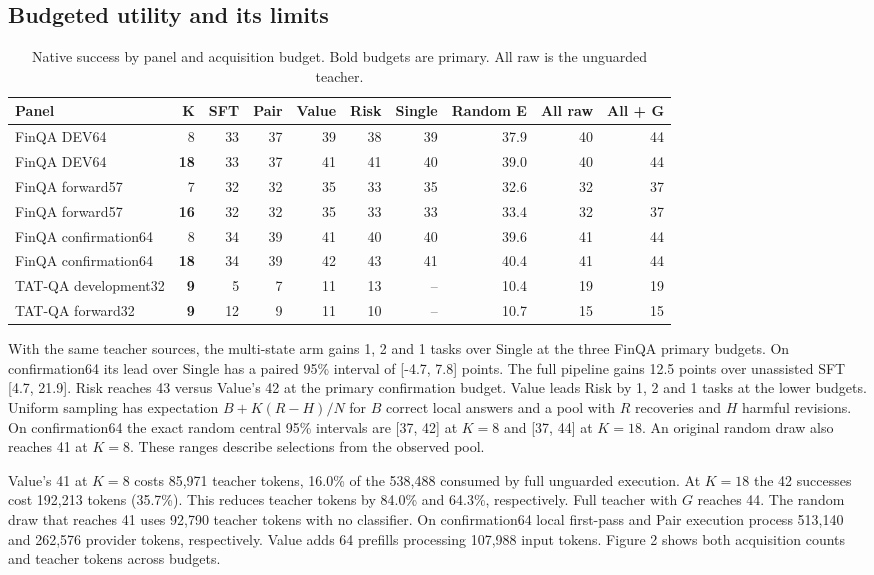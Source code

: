 \documentclass[10pt,letterpaper,conference]{IEEEtran}
\begin{document}
\subsection{Budgeted utility and its limits}\label{budgeted-utility-and-its-limits}

\begin{table}[!t]
\centering
\caption{Native success by panel and acquisition budget. Bold budgets are primary. All raw is the unguarded teacher.}
\label{tab:2}
\begin{tabular}{@{}lrrrrrrrrr@{}}
\toprule
Panel & K & SFT & Pair & Value & Risk & Single & Random E & All raw & All + G \\
\midrule
FinQA DEV64 & 8 & 33 & 37 & 39 & 38 & 39 & 37.9 & 40 & 44 \\
FinQA DEV64 & \textbf{18} & 33 & 37 & 41 & 41 & 40 & 39.0 & 40 & 44 \\
FinQA forward57 & 7 & 32 & 32 & 35 & 33 & 35 & 32.6 & 32 & 37 \\
FinQA forward57 & \textbf{16} & 32 & 32 & 35 & 33 & 33 & 33.4 & 32 & 37 \\
FinQA confirmation64 & 8 & 34 & 39 & 41 & 40 & 40 & 39.6 & 41 & 44 \\
FinQA confirmation64 & \textbf{18} & 34 & 39 & 42 & 43 & 41 & 40.4 & 41 & 44 \\
TAT-QA development32 & \textbf{9} & 5 & 7 & 11 & 13 & -- & 10.4 & 19 & 19 \\
TAT-QA forward32 & \textbf{9} & 12 & 9 & 11 & 10 & -- & 10.7 & 15 & 15 \\
\bottomrule
\end{tabular}
\end{table}

With the same teacher sources, the multi-state arm gains 1, 2 and 1 tasks over Single at the three FinQA primary budgets. On confirmation64 its lead over Single has a paired 95\% interval of {[}-4.7, 7.8{]} points. The full pipeline gains 12.5 points over unassisted SFT {[}4.7, 21.9{]}. Risk reaches 43 versus Value's 42 at the primary confirmation budget. Value leads Risk by 1, 2 and 1 tasks at the lower budgets. Uniform sampling has expectation \(B+K(R-H)/N\) for \(B\) correct local answers and a pool with \(R\) recoveries and \(H\) harmful revisions. On confirmation64 the exact random central 95\% intervals are {[}37, 42{]} at \(K=8\) and {[}37, 44{]} at \(K=18\). An original random draw also reaches 41 at \(K=8\). These ranges describe selections from the observed pool.

Value's 41 at \(K=8\) costs 85,971 teacher tokens, 16.0\% of the 538,488 consumed by full unguarded execution. At \(K=18\) the 42 successes cost 192,213 tokens (35.7\%). This reduces teacher tokens by 84.0\% and 64.3\%, respectively. Full teacher with \(G\) reaches 44. The random draw that reaches 41 uses 92,790 teacher tokens with no classifier. On confirmation64 local first-pass and Pair execution process 513,140 and 262,576 provider tokens, respectively. Value adds 64 prefills processing 107,988 input tokens. Figure 2 shows both acquisition counts and teacher tokens across budgets.
\end{document}
